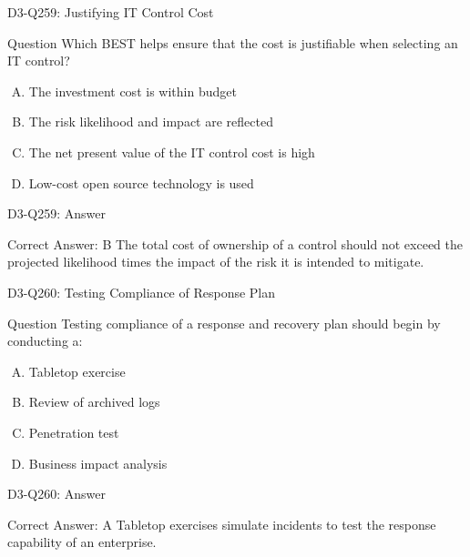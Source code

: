 \documentclass{beamer}
\begin{document}
	\begin{frame}{D3-Q259: Justifying IT Control Cost}
		\begin{block}{Question}
			Which BEST helps ensure that the cost is justifiable when selecting an IT control?
		\end{block}
		\begin{enumerate}[(A)]
			\item The investment cost is within budget
			\item The risk likelihood and impact are reflected
			\item The net present value of the IT control cost is high
			\item Low-cost open source technology is used
		\end{enumerate}
	\end{frame}
	\begin{frame}{D3-Q259: Answer}
		\begin{block}{Correct Answer: B}
			The total cost of ownership of a control should not exceed the projected likelihood times the impact of the risk it is intended to mitigate.
		\end{block}
	\end{frame}
	
	\begin{frame}{D3-Q260: Testing Compliance of Response Plan}
		\begin{block}{Question}
			Testing compliance of a response and recovery plan should begin by conducting a:
		\end{block}
		\begin{enumerate}[(A)]
			\item Tabletop exercise
			\item Review of archived logs
			\item Penetration test
			\item Business impact analysis
		\end{enumerate}
	\end{frame}
	\begin{frame}{D3-Q260: Answer}
		\begin{block}{Correct Answer: A}
			Tabletop exercises simulate incidents to test the response capability of an enterprise.
		\end{block}
	\end{frame}
	
\end{document}
